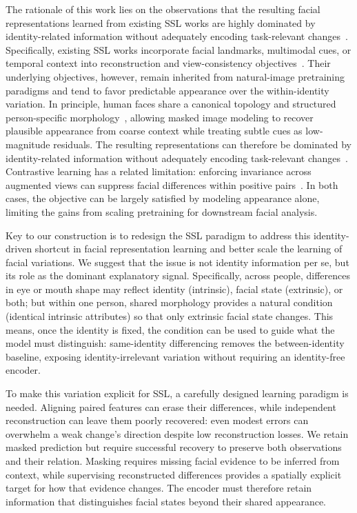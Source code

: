 \documentclass[10pt,journal,compsoc]{IEEEtran}
\begin{document}
The rationale of this work lies on the observations that the resulting facial representations learned from existing SSL works are highly dominated by identity-related information without adequately encoding task-relevant changes~\cite{ning2024representation}. Specifically, existing SSL works incorporate facial landmarks, multimodal cues, or temporal context into reconstruction and view-consistency objectives~\cite{zheng2022general,ma2024facial,wang2025fsfm,cai2023marlin,sun2023mae}. Their underlying objectives, however, remain inherited from natural-image pretraining paradigms and tend to favor predictable appearance over the within-identity variation. In principle, human faces share a canonical topology and structured person-specific morphology~\cite{zhu2019face}, allowing masked image modeling to recover plausible appearance from coarse context while treating subtle cues as low-magnitude residuals. The resulting representations can therefore be dominated by identity-related information without adequately encoding task-relevant changes~\cite{ning2024representation}. Contrastive learning has a related limitation: enforcing invariance across augmented views can suppress facial differences within positive pairs~\cite{sun2024contrast}. In both cases, the objective can be largely satisfied by modeling appearance alone, limiting the gains from scaling pretraining for downstream facial analysis.

Key to our construction is to redesign the SSL paradigm to address this identity-driven shortcut in facial representation learning and better scale the learning of facial variations. We suggest that the issue is not identity information per se, but its role as the dominant explanatory signal. Specifically, across people, differences in eye or mouth shape may reflect identity (intrinsic), facial state (extrinsic), or both; but within one person, shared morphology provides a natural condition (identical intrinsic attributes) so that only extrinsic facial state changes. This means, once the identity is fixed, the condition can be used to guide what the model must distinguish: same-identity differencing removes the between-identity baseline, exposing identity-irrelevant variation without requiring an identity-free encoder.

To make this variation explicit for SSL, a carefully designed learning paradigm is needed. Aligning paired features can erase their differences, while independent reconstruction can leave them poorly recovered: even modest errors can overwhelm a weak change's direction despite low reconstruction losses. We retain masked prediction but require successful recovery to preserve both observations and their relation. Masking requires missing facial evidence to be inferred from context, while supervising reconstructed differences provides a spatially explicit target for how that evidence changes. The encoder must therefore retain information that distinguishes facial states beyond their shared appearance.
\end{document}
